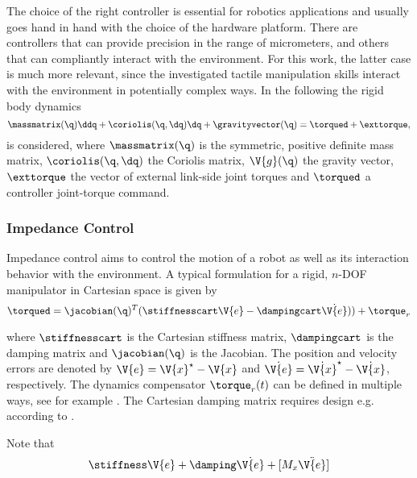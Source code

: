 The choice of the right controller is essential for robotics applications and usually goes hand in hand with the choice of the hardware platform.
There are controllers that can provide precision in the range of micrometers, and others that can compliantly interact with the environment.
For this work, the latter case is much more relevant, since the investigated tactile manipulation skills interact with the environment in potentially complex ways.
In the following the rigid body dynamics
\begin{equation}
{\massmatrix}(\q)\ddq+{\coriolis}(\q,\dq)\dq+\gravityvector(\q)=\torqued+\exttorque,
\end{equation}
is considered, where ${\massmatrix}(\q)$ is the symmetric, positive definite mass matrix, $\coriolis(\q,\dq)$ the Coriolis matrix, $\V{g}(\q)$ the gravity vector, $\exttorque$ the vector of external link-side joint torques and $\torqued$ a controller joint-torque command.

\subsubsection{Impedance Control}

Impedance control aims to control the motion of a robot as well as its interaction behavior with the environment.
A typical formulation for a rigid, $n$-DOF manipulator in Cartesian space is given by
\begin{equation}
\torqued=\jacobian(\q)^T(\stiffnesscart \V{e} - \dampingcart \dot{\V{e}})) + \torque_r
\end{equation}

where $\stiffnesscart$ is the Cartesian stiffness matrix, $\dampingcart$ is the damping matrix and $\jacobian(\q)$ is the Jacobian.
The position and velocity errors are denoted by $\V{e}=\V{x}^\star - \V{x}$ and $\dot{\V{e}}=\dot{\V{x}}^\star - \dot{\V{x}}$, respectively.
The dynamics compensator $\torque_r(t)$ can be defined in multiple ways, see for example \cite{Yang.2011}.
The Cartesian damping matrix requires design e.g. according to \cite{AlbuSchaffer.2003}.

Note that
\begin{equation}
\stiffness \V{e} + \damping \dot{\V{e}} + [M_x \ddot{\V{e}}]
\end{equation}

